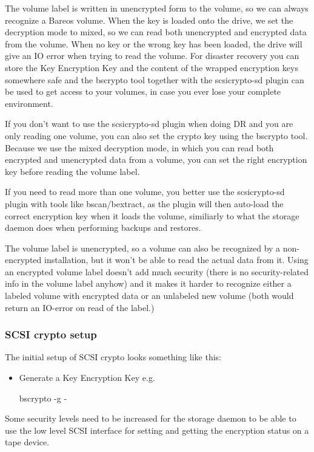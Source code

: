 The volume label is written in unencrypted form to the volume, so we can always recognize a Bareos volume. When the key is loaded onto the drive, we set the decryption mode to mixed, so we can read both unencrypted and encrypted data from the volume. When no key or the wrong key has been loaded, the drive will give an IO error when trying to read the volume.
For disaster recovery you can store the Key Encryption Key and the content of the wrapped encryption keys somewhere safe and the bscrypto tool together with the scsicrypto-sd plugin can be used to get access to your volumes, in case you ever lose your complete environment.

If you don't want to use the scsicrypto-sd plugin when doing DR and you are only reading one volume, you can also set the crypto key using the bscrypto tool. Because we use the mixed decryption mode, in which you can read both encrypted and unencrypted data from a volume, you can set the right encryption key before reading the volume label.

If you need to read more than one volume, you better use the scsicrypto-sd plugin with tools like bscan/bextract, as the plugin will then auto-load the correct encryption key when it loads the volume, similiarly to what the storage daemon does when performing backups and restores.

The volume label is unencrypted, so a volume can also be recognized by a non-encrypted installation, but it won't be able to read the actual data from it. Using an encrypted volume label doesn't add much security (there is no security-related info in the volume label anyhow) and it makes it harder to recognize either a labeled volume with encrypted data or an unlabeled new volume (both would return an IO-error on read of the label.)

\subsubsection{SCSI crypto setup}
%
The initial setup of SCSI crypto looks something like this:
%
\begin{itemize}
 \item Generate a Key Encryption Key e.g.
\begin{commands}{}
bscrypto -g -
\end{commands}
\end{itemize}

Some security levels need to be increased for the storage daemon to be able to use the low level SCSI interface for setting and getting the encryption status on a tape device.

